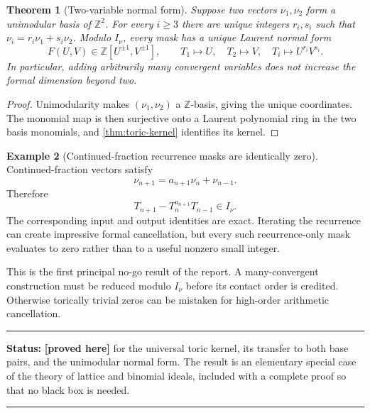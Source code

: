 \documentclass[11pt,oneside]{article}
\newtheorem{theorem}{Theorem}[section]
\theoremstyle{definition}
\newtheorem{example}[theorem]{Example}
\theoremstyle{remark}
\newcommand{\Z}{\mathbb Z}
\newcommand{\statusproved}{\textcolor{provedgreen}{\textbf{[proved here]}}}
\newenvironment{statusbox}[1]
{\begin{center}\begin{minipage}{0.94\textwidth}\raggedright\hrule\vspace{0.45em}
\textbf{Status:} #1\par\vspace{0.35em}}
{\vspace{0.35em}\hrule\end{minipage}\end{center}}
\begin{document}
\begin{theorem}[Two-variable normal form]
\label{thm:two-variable-normal-form}
Suppose two vectors $\nu_1,\nu_2$ form a unimodular basis of $\Z^2$.  For every
$i\ge3$ there are unique integers $r_i,s_i$ such that
$\nu_i=r_i\nu_1+s_i\nu_2$.  Modulo $I_\nu$, every mask has a unique Laurent normal form
\begin{equation}
 F(U,V)\in\Z[U^{\pm1},V^{\pm1}],
 \qquad
 T_1\mapsto U,
 \quad T_2\mapsto V,
 \quad T_i\mapsto U^{r_i}V^{s_i}.
 \label{eq:two-variable-normal-form}
\end{equation}
In particular, adding arbitrarily many convergent variables does not increase the formal
dimension beyond two.
\end{theorem}

\begin{proof}
Unimodularity makes $(\nu_1,\nu_2)$ a $\Z$-basis, giving the unique coordinates.  The
monomial map is then surjective onto a Laurent polynomial ring in the two basis monomials,
and \cref{thm:toric-kernel} identifies its kernel.
\end{proof}

\begin{example}[Continued-fraction recurrence masks are identically zero]
\label{ex:cf-toric-zero}
Continued-fraction vectors satisfy
\[
 \nu_{n+1}=a_{n+1}\nu_n+\nu_{n-1}.
\]
Therefore
\begin{equation}
 T_{n+1}-T_n^{a_{n+1}}T_{n-1}\in I_\nu.
 \label{eq:cf-toric-binomial}
\end{equation}
The corresponding input and output identities are exact.  Iterating the recurrence can
create impressive formal cancellation, but every such recurrence-only mask evaluates to
zero rather than to a useful nonzero small integer.
\end{example}

This is the first principal no-go result of the report.  A many-convergent construction must
be reduced modulo $I_\nu$ before its contact order is credited.  Otherwise torically trivial
zeros can be mistaken for high-order arithmetic cancellation.

\begin{statusbox}{\statusproved{} for the universal toric kernel, its transfer to both base
pairs, and the unimodular normal form.  The result is an elementary special case of the theory
of lattice and binomial ideals, included with a complete proof so that no black box is needed.}
\end{statusbox}
\end{document}
